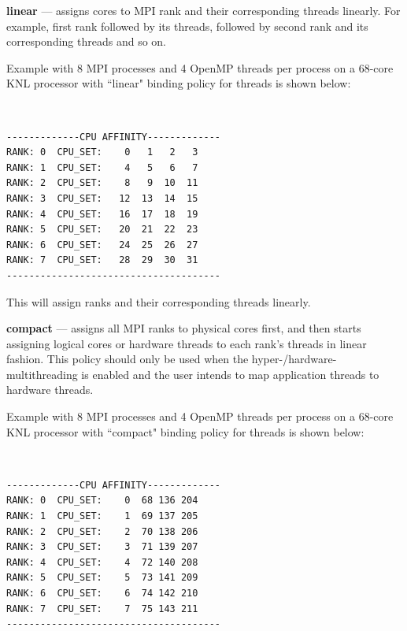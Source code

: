 \textbf{linear} --- assigns cores to MPI rank and their corresponding threads
linearly. For example, first rank followed by its threads, followed by second 
rank and its corresponding threads and so on.

Example with 8 MPI processes and 4 OpenMP threads per process on a 68-core KNL
processor with ``linear" binding policy for threads is shown below:

\\

\begin{verbatim}
-------------CPU AFFINITY-------------
RANK: 0  CPU_SET:    0   1   2   3
RANK: 1  CPU_SET:    4   5   6   7
RANK: 2  CPU_SET:    8   9  10  11
RANK: 3  CPU_SET:   12  13  14  15
RANK: 4  CPU_SET:   16  17  18  19
RANK: 5  CPU_SET:   20  21  22  23
RANK: 6  CPU_SET:   24  25  26  27
RANK: 7  CPU_SET:   28  29  30  31
--------------------------------------
\end{verbatim}

This will assign ranks and their corresponding threads linearly.

\textbf{compact} --- assigns all MPI ranks to physical cores first, and then
starts assigning logical cores or hardware threads to each rank's threads in 
linear fashion. This policy should only be used when the 
hyper-/hardware-multithreading is enabled
and the user intends to map application threads to hardware threads.

Example with 8 MPI processes and 4 OpenMP threads per process on a 68-core KNL
processor with ``compact" binding policy for threads is shown below:

\\

\begin{verbatim}
-------------CPU AFFINITY-------------
RANK: 0  CPU_SET:    0  68 136 204
RANK: 1  CPU_SET:    1  69 137 205
RANK: 2  CPU_SET:    2  70 138 206
RANK: 3  CPU_SET:    3  71 139 207
RANK: 4  CPU_SET:    4  72 140 208
RANK: 5  CPU_SET:    5  73 141 209
RANK: 6  CPU_SET:    6  74 142 210
RANK: 7  CPU_SET:    7  75 143 211
--------------------------------------
\end{verbatim}


